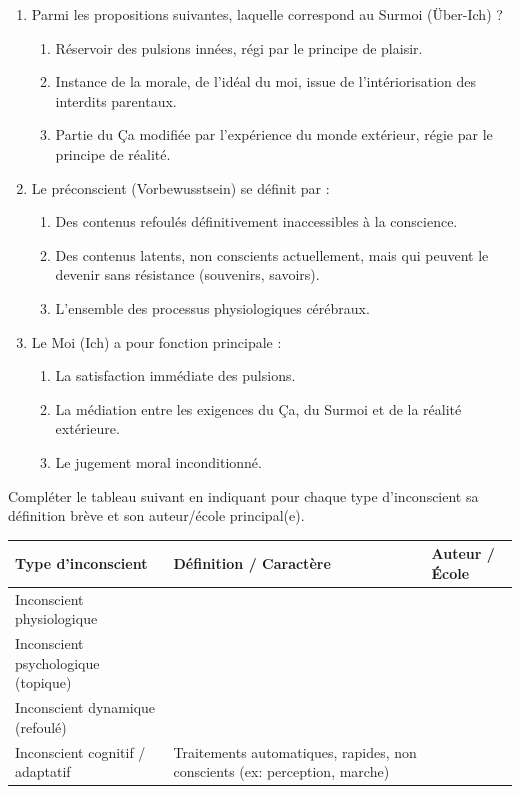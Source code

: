 \documentclass[11pt]{article}
\begin{document}
\begin{exercice}
\begin{enumerate}
    \item Parmi les propositions suivantes, laquelle correspond au \og Surmoi \fg{} (Über-Ich) ?
    \begin{enumerate}
        \item Réservoir des pulsions innées, régi par le principe de plaisir.
        \item Instance de la morale, de l'idéal du moi, issue de l'intériorisation des interdits parentaux.
        \item Partie du Ça modifiée par l'expérience du monde extérieur, régie par le principe de réalité.
    \end{enumerate}
    \item Le \og préconscient \fg{} (Vorbewusstsein) se définit par :
    \begin{enumerate}
        \item Des contenus refoulés définitivement inaccessibles à la conscience.
        \item Des contenus latents, non conscients actuellement, mais qui peuvent le devenir sans résistance (souvenirs, savoirs).
        \item L'ensemble des processus physiologiques cérébraux.
    \end{enumerate}
    \item Le \og Moi \fg{} (Ich) a pour fonction principale :
    \begin{enumerate}
        \item La satisfaction immédiate des pulsions.
        \item La médiation entre les exigences du Ça, du Surmoi et de la réalité extérieure.
        \item Le jugement moral inconditionné.
    \end{enumerate}
\end{enumerate}
\end{exercice}

\begin{exercice}
Compléter le tableau suivant en indiquant pour chaque type d'inconscient sa définition brève et son auteur/école principal(e).

\begin{tabular}{|p{3.5cm}|p{6cm}|p{3.5cm}|}
\hline
\textbf{Type d'inconscient} & \textbf{Définition / Caractère} & \textbf{Auteur / École} \\
\hline
Inconscient physiologique &  &  \\
\hline
Inconscient psychologique (topique) &  &  \\
\hline
Inconscient dynamique (refoulé) &  &  \\
\hline
Inconscient cognitif / adaptatif & Traitements automatiques, rapides, non conscients (ex: perception, marche) &  \\
\hline
\end{tabular}
\end{exercice}
\end{document}
